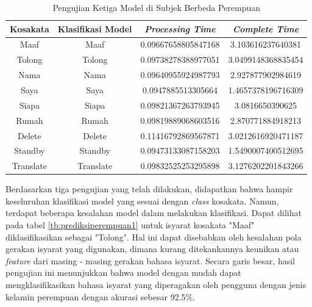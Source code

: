 \begin{longtable}{|c|c|c|c|}
  \caption{Pengujian Ketiga Model di Subjek Berbeda Perempuan}
  \label{tb:prediksiperempuan3}                                   \\
  \hline
  \rowcolor[HTML]{C0C0C0}
  \textbf{Kosakata} & \textbf{Klasifikasi Model} & \textbf{\emph{Processing Time}} & \textbf{\emph{Complete Time}}\\
  \hline
  Maaf              & Maaf                        & 0.09667658805847168                           & 3.103616237640381                                  \\
  Tolong            & Tolong                        & 0.09738278388977051                           & 3.0499148368835454                                  \\
  Nama              & Nama                        & 0.09640955924987793                           & 2.927877902984619                                  \\
  Saya              & Saya                        & 0.0947885513305664                           & 1.4657378196716309                                  \\
  Siapa              & Siapa                        & 0.09821367263793945                           & 3.0816650390625                                  \\
  Rumah             & Rumah                        & 0.09819889068603516                           & 2.870771884918213                                  \\
  Delete            & Delete                        & 0.11416792869567871                           & 3.0212616920471187                                  \\
  Standby           & Standby                        & 0.09473133087158203                           & 1.5490007400512695                                  \\
  Translate         & Translate                        & 0.09832525253295898                           & 3.1276202201843266                                  \\
  \hline
\end{longtable}

Berdasarkan tiga pengujian yang telah dilakukan, didapatkan bahwa hampir keseluruhan klasifikasi model yang sesuai dengan \emph{class} kosakata. Namun, terdapat beberapa kesalahan model dalam melakukan klasifikasi. Dapat dilihat pada tabel \ref{tb:prediksiperempuan1} untuk isyarat kosakata "Maaf" diklasifikasikan sebagai "Tolong". Hal ini dapat disebabkan oleh kesalahan pola gerakan isyarat yang digunakan, dimana kurang ditekankannya keunikan atau \emph{feature} dari masing - masing gerakan bahasa isyarat.  Secara garis besar, hasil pengujian ini menunjukkan bahwa model dengan mudah dapat mengklasifikasikan bahasa isyarat yang diperagakan oleh pengguna dengan jenis kelamin perempuan dengan akurasi sebesar 92.5\%. 

